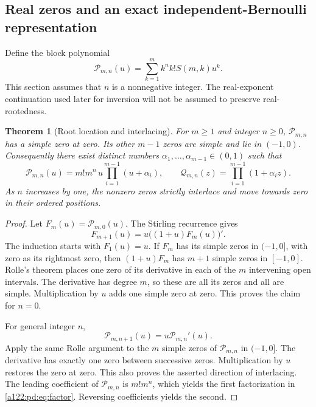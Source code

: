 \documentclass[11pt,letterpaper]{article}
\numberwithin{equation}{subsection}
\newtheorem{theorem}{Theorem}[subsection]
\theoremstyle{definition}
\theoremstyle{remark}
\theoremstyle{plain}
\newcommand{\cP}{\mathcal P}
\newcommand{\cQ}{\mathcal Q}
\begin{document}
\subsection{Real zeros and an exact independent-Bernoulli representation}
\label{a122:pd:sec:roots}
Define the block polynomial
\begin{equation}\label{a122:pd:eq:blockpoly}
 \cP_{m,n}(u)=\sum_{k=1}^m k^n k!S(m,k)u^k.
\end{equation}
This section assumes that $n$ is a nonnegative integer.
The real-exponent continuation used later for inversion will not be
assumed to preserve real-rootedness.

\begin{theorem}[Root location and interlacing]\label{a122:pd:thm:roots}
For $m\ge1$ and integer $n\ge0$, $\cP_{m,n}$ has a simple zero at zero.
Its other $m-1$ zeros are simple and lie in $(-1,0)$.
Consequently there exist distinct numbers
$\alpha_1,\ldots,\alpha_{m-1}\in(0,1)$ such that
\begin{equation}\label{a122:pd:eq:factor}
 \cP_{m,n}(u)=m!m^n\,u\prod_{i=1}^{m-1}(u+\alpha_i),\qquad
 \cQ_{m,n}(z)=\prod_{i=1}^{m-1}(1+\alpha_i z).
\end{equation}
As $n$ increases by one, the nonzero zeros strictly interlace and move
towards zero in their ordered positions.
\end{theorem}
\begin{proof}
Let $F_m(u)=\cP_{m,0}(u)$. The Stirling recurrence gives
\begin{equation}\label{a122:pd:eq:Frec}
 F_{m+1}(u)=u\big((1+u)F_m(u)\big)'.
\end{equation}
The induction starts with $F_1(u)=u$. If $F_m$ has its simple zeros in
$(-1,0]$, with zero as its rightmost zero, then $(1+u)F_m$ has $m+1$
simple zeros in $[-1,0]$. Rolle's theorem places one zero of its
derivative in each of the $m$ intervening open intervals. The derivative
has degree $m$, so these are all its zeros and all are simple.
Multiplication by $u$ adds one simple zero at zero. This proves the
claim for $n=0$.

For general integer $n$,
\begin{equation}\label{a122:pd:eq:Euler}
 \cP_{m,n+1}(u)=u\cP_{m,n}'(u).
\end{equation}
Apply the same Rolle argument to the $m$ simple zeros of
$\cP_{m,n}$ in $(-1,0]$. The derivative has exactly one zero between
successive zeros. Multiplication by $u$ restores the zero at zero.
This also proves the asserted direction of interlacing.
The leading coefficient of $\cP_{m,n}$ is $m!m^n$, which yields the
first factorization in \eqref{a122:pd:eq:factor}. Reversing coefficients yields
the second.
\end{proof}
\end{document}
